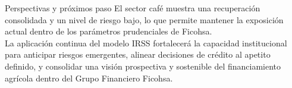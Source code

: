 \documentclass[final]{beamer}
\newlength{\sepwidth}
\newlength{\colwidth}
\newcommand{\separatorcolumn}{\begin{column}{\sepwidth}\end{column}}
\begin{document}
\begin{frame}[t]
\begin{columns}[t]
\begin{column}{\colwidth}
\begin{block}{Perspectivas y próximos paso}
El sector café muestra una recuperación consolidada y un nivel de riesgo bajo, lo que permite mantener la exposición actual dentro de los parámetros prudenciales de Ficohsa. \\[0.4cm]
La aplicación continua del modelo IRSS fortalecerá la capacidad institucional para anticipar riesgos emergentes, alinear decisiones de crédito al apetito definido, y consolidar una visión prospectiva y sostenible del financiamiento agrícola dentro del Grupo Financiero Ficohsa. 
  \end{block}

\end{column}

\separatorcolumn
\end{columns}
\end{frame}
\end{document}
